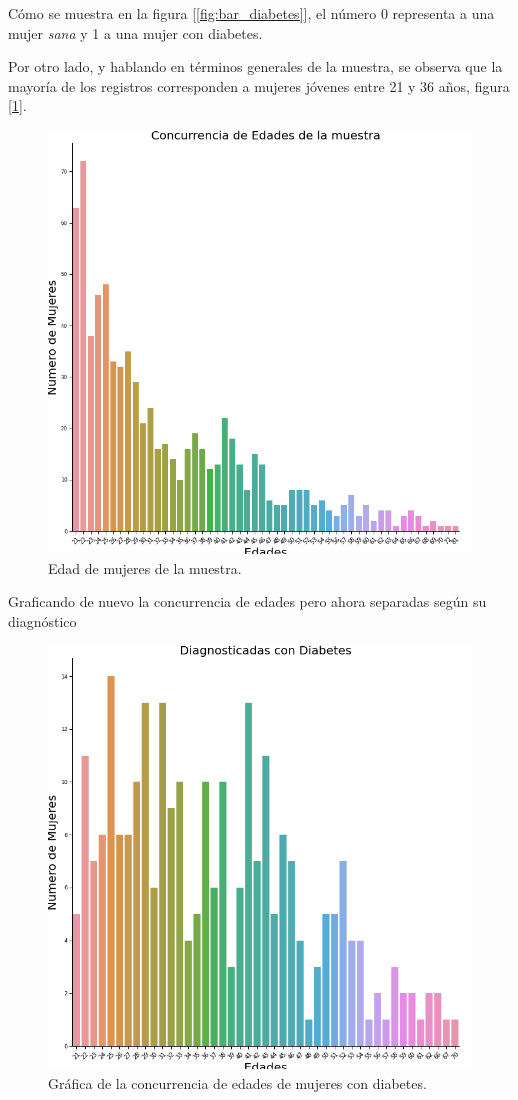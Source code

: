 \documentclass{article}
\begin{document}
Cómo se muestra en la figura [\ref{fig:bar_diabetes}], el número 0 representa a una mujer \emph{sana} y 1 a una mujer con diabetes.

Por otro lado, y hablando en términos generales de la muestra, se observa que la mayoría de los registros corresponden a mujeres jóvenes entre 21 y 36 años, figura [\ref{fig:edad_muestra}]. 

\begin{figure}[H]
	\centering
	\includegraphics[width=0.65\linewidth]{edad_muestra.png}
	\caption{Edad de mujeres de la muestra.}%
	\label{fig:edad_muestra}
\end{figure}

Graficando de nuevo la concurrencia de edades pero ahora separadas según su diagnóstico

\begin{figure}[H]
	\centering
	\includegraphics[width=0.65\linewidth]{edad_diabetes.png}
	\caption{Gráfica de la concurrencia de edades de mujeres con diabetes.}%
	\label{fig:edad_diabetes}
\end{figure}
\end{document}
